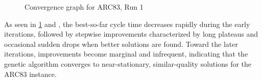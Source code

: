 \documentclass[12pt,a4paper]{article}
\begin{document}
\begin{figure}[h!]
\centering
{}
\caption{Convergence graph for ARC83, Run 1}
\label{fig:csv-graph_arc83}
\end{figure}

 
As seen in \cref{fig:csv-graph_arc83} and \label{fig:arc83-convergence},  the best-so-far cycle time decreases rapidly during the early iterations, followed by stepwise improvements characterized by long plateaus and occasional sudden drops when better solutions are found. Toward the later iterations, improvements become marginal and infrequent, indicating that the genetic algorithm converges to near-stationary, similar-quality solutions for the ARC83 instance.
\end{document}
